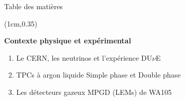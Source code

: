 

\trackstrue



    {
        \begin{specialframe}
            \vspace{2cm}\hspace*{-1.8cm}\parbox[t]{\textwidth}{\titlepage}
        \end{specialframe}
    }
    \begin{specialframe}{Table des matières}
        \begin{textblock*}{\textwidth}(1cm,0.35\textheight)
            \tableofcontents[hideallsubsections]
        \end{textblock*}
    \end{specialframe}

  \setcounter{framenumber}{0}
    {
        \begin{specialframe}
            \vspace{2cm}\hspace*{-1.8cm}\parbox[t]{\textwidth}{
                \begin{center}
                    \begin{huge}
                            \textcolor{pheniics_purple}{\textbf{Contexte physique et expérimental}}
                    \end{huge}
                    \vspace{1cm}
                    \begin{enumerate}
                        \item Le CERN, les neutrinos et l'expérience DU$\nu$E 
                        \item TPCs à argon liquide Simple phase et Double phase
                        \item Les détecteurs gazeux MPGD (LEMs) de WA105
                    \end{enumerate}
                \end{center}
            }
        \end{specialframe}
    }

